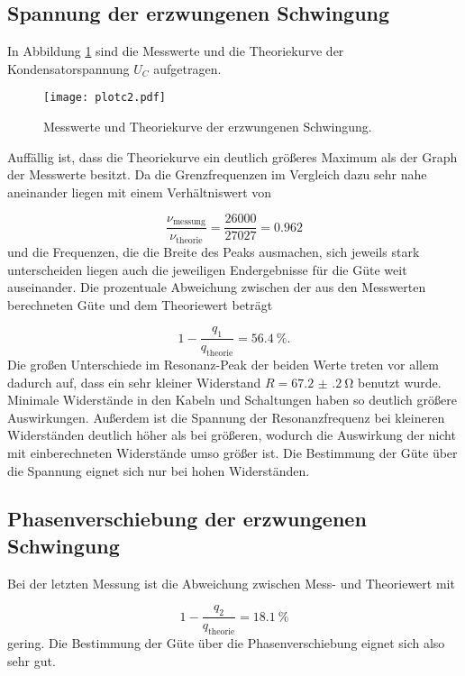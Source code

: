 \subsection{Spannung der erzwungenen Schwingung}

In Abbildung \ref{fig:Theo} sind die Messwerte und die Theoriekurve der
Kondensatorspannung $U_C$ aufgetragen.

\newpage

\begin{figure}[h]
  \centering
  \texttt{[image: plotc2.pdf]}
  \caption{Messwerte und Theoriekurve der erzwungenen Schwingung.}
  \label{fig:Theo}
\end{figure}

Auffällig ist, dass die Theoriekurve ein deutlich größeres Maximum als der
Graph der Messwerte besitzt. Da die Grenzfrequenzen im Vergleich dazu
sehr nahe aneinander liegen mit einem Verhältniswert von

\begin{equation}
  \frac{\nu_\text{messung}}{\nu_\text{theorie}} = \frac{26000}{27027}
  = 0.962
\end{equation}
und die Frequenzen, die die Breite des Peaks ausmachen, sich jeweils
stark unterscheiden liegen auch die jeweiligen Endergebnisse für die Güte
weit auseinander.
Die prozentuale Abweichung zwischen der aus den Messwerten berechneten Güte
und dem Theoriewert beträgt

\begin{equation}
  1 - \frac{q_1}{q_\text{theorie}} =
  \SI{56.4}{\percent}.
\end{equation}
Die großen Unterschiede im Resonanz-Peak der beiden Werte treten vor allem
dadurch auf, dass ein sehr kleiner Widerstand $R = \SI{67.2(2)}{\ohm}$
benutzt wurde. Minimale Widerstände in den Kabeln und Schaltungen
haben so deutlich größere Auswirkungen.
Außerdem ist die Spannung der Resonanzfrequenz bei kleineren Widerständen
deutlich höher als bei größeren, wodurch die Auswirkung der nicht mit
einberechneten Widerstände umso größer ist.
Die Bestimmung der Güte über die Spannung eignet sich nur bei hohen
Widerständen.

\subsection{Phasenverschiebung der erzwungenen Schwingung}

Bei der letzten Messung ist die Abweichung zwischen Mess- und Theoriewert
mit

\begin{equation}
  1-\frac{q_2}{q_\text{theorie}} =
  \SI{18.1}{\percent}
\end{equation}
gering.
Die Bestimmung der Güte über die Phasenverschiebung eignet sich also sehr gut.
